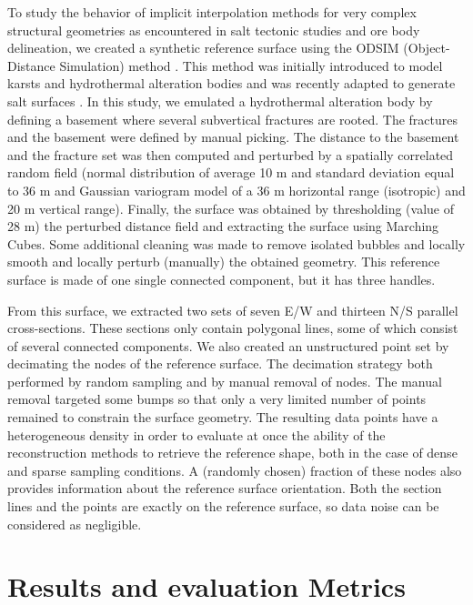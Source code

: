\documentclass[final]{ring20}
\begin{document}
{To study the behavior of implicit interpolation methods for very complex structural geometries as encountered in salt tectonic studies and ore body delineation, we created a synthetic reference surface using the ODSIM (Object-Distance Simulation) method \citep{Henrion2010MG}. This method was initially introduced to model karsts and hydrothermal alteration bodies \citep{Henrion2008PEIGC,Rongier2014G} and was recently adapted to generate salt surfaces \citep{Clausolles20188ECE2}. In this study, we emulated a hydrothermal alteration body by defining a basement where several subvertical fractures are rooted. The fractures and the basement were defined by manual picking. The distance to the basement and the fracture set was then computed and perturbed by a spatially correlated random field (normal distribution of average 10 m and standard deviation equal to 36 m and Gaussian variogram model of a 36 m horizontal range (isotropic) and 20 m vertical range). Finally, the surface was obtained 
by thresholding (value of 28 m) the perturbed distance field and extracting the surface using Marching Cubes. Some additional cleaning was made to remove isolated bubbles and locally smooth and locally perturb (manually) the obtained geometry. This reference surface is made of one single connected component, but it has three handles. 

From this surface, we extracted two sets of seven E/W and thirteen N/S parallel cross-sections. These sections only contain polygonal lines, some of which consist of several connected components. We also created an unstructured point set by decimating the nodes of the reference surface. The decimation strategy both performed by random sampling and by manual removal of nodes. The manual removal targeted some bumps so that only a very limited number of points remained to constrain the surface geometry. The resulting data points have a heterogeneous density in order to evaluate at once the ability of the reconstruction methods to retrieve the reference shape, both in the case of dense and sparse sampling conditions. A (randomly chosen) fraction of these nodes also provides information about the reference surface orientation. Both the section lines and the points are exactly on the reference surface, so data noise can be considered as negligible. 


\section{Results and evaluation Metrics}
\label{sec:results}

}
\end{document}
